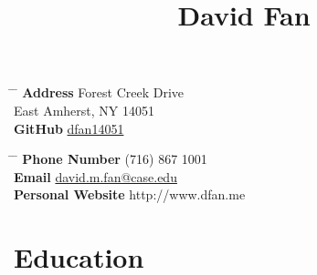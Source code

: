 \documentclass[10pt]{article} %
\begin{document}

\title{David Fan} %


\parbox{0.5\textwidth}{ %
\begin{tabbing} %
\hspace{3cm} \= \hspace{4cm} \= \kill %
{\bf Address}  Forest Creek Drive\\ %
\> East Amherst, NY 14051 \\ %
{\bf GitHub} \> \href{https://github.com/dfan14051}{dfan14051}
\end{tabbing}}
\hfill %
\parbox{0.5\textwidth}{ %
\begin{tabbing} %
\hspace{3cm} \= \hspace{4cm} \= \kill %
{\bf Phone Number} \> (716) 867 1001 \\ %
{\bf Email} \> \href{mailto:david.m.fan@case.edu}{david.m.fan@case.edu} \\ %
{\bf Personal Website} \> http://www.dfan.me
\end{tabbing}}


\section{Education}

\end{document}

